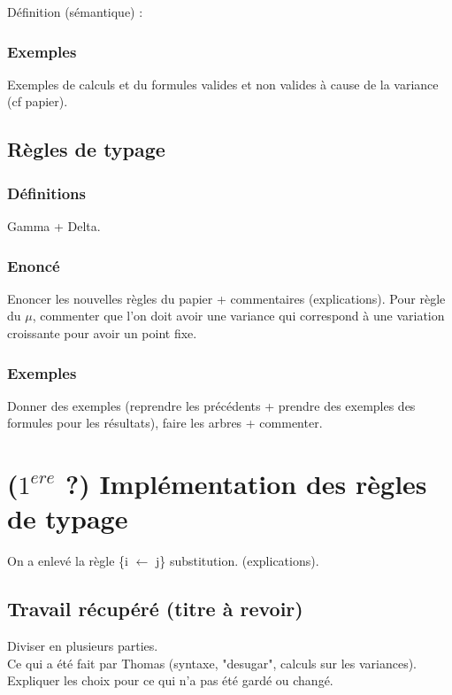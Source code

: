 \documentclass[11pt,a4paper]{article}
\theoremstyle{plain}
\theoremstyle{remark}
\theoremstyle{definition}
\begin{document}
Définition (sémantique) : 


\subsubsection{Exemples}

Exemples de calculs et du formules valides et non valides à cause de la variance (cf papier).

\subsection{Règles de typage}

\subsubsection{Définitions}

Gamma + Delta.

\subsubsection{Enoncé}

Enoncer les nouvelles règles du papier + commentaires (explications). \color{red} Pour règle du $\mu$, commenter que l'on doit avoir une variance qui correspond à une variation croissante pour avoir un point fixe. \color{black}

\subsubsection{Exemples}

Donner des exemples (reprendre les précédents + prendre des exemples des formules pour les résultats), faire les arbres + commenter.

\section{($1^{ere}$ ?) Implémentation des règles de typage}

On a enlevé la règle \{i $\longleftarrow$ j\} substitution. (explications).


\subsection{Travail récupéré (titre à revoir)}

Diviser en plusieurs parties.
\\
Ce qui a été fait par Thomas (syntaxe, "desugar", calculs sur les variances). 
\\
Expliquer les choix pour ce qui n'a pas été gardé ou changé. 
\end{document}
